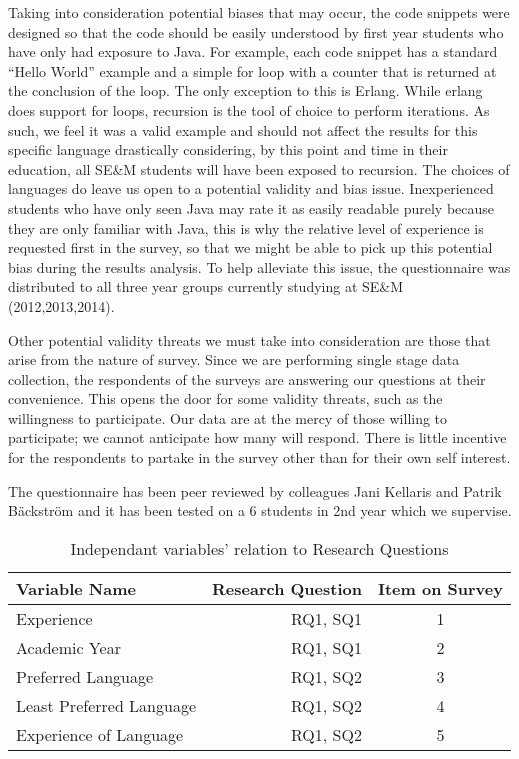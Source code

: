 \documentclass[times, 10pt,twocolumn]{IEEEtran}
\begin{document}
Taking into consideration potential biases that may occur, the code snippets were designed so that the code should be easily understood by first year students who have only had exposure to Java. For example, each code snippet has a standard ``Hello World'' example and a simple for loop with a counter that is returned at the conclusion of the loop. The only exception to this is Erlang. While erlang does support for loops, recursion is the tool of choice to perform iterations. As such, we feel it was a valid example and should not affect the results for this specific language drastically considering, by this point and time in their education, all SE\&M students will have been exposed to recursion. The choices of languages do leave us open to a potential validity and bias issue. Inexperienced students who have only seen Java may rate it as easily readable purely because they are only familiar with Java, this is why the relative level of experience is requested first in the survey, so that we might be able to pick up this potential bias during the results analysis. To help alleviate this issue, the questionnaire was distributed to all three year groups currently studying at SE\&M (2012,2013,2014).
\newline

Other potential validity threats we must take into consideration are those that arise from the nature of survey. Since we are performing single stage data collection, the respondents of the surveys are answering our questions at their convenience. This opens the door for some validity threats, such as the willingness to participate. Our data are at the mercy of those willing to participate; we cannot anticipate how many will respond. There is little incentive for the respondents to partake in the survey other than for their own self interest. 
\newline

The questionnaire has been peer reviewed by colleagues Jani Kellaris and Patrik Bäckström and it has been tested on a 6 students in 2nd year which we supervise. 

\begin{table}[ht]
  \centering
  \begin{tabular}{| l | r | c |}
    \hline
    \textbf{Variable Name} & \textbf{Research Question} & \textbf{Item on Survey} \\ \hline
    Experience & RQ1, SQ1 & 1 \\ \hline
    Academic Year & RQ1, SQ1 & 2 \\ \hline
    Preferred Language & RQ1, SQ2 & 3 \\ \hline
    Least Preferred Language & RQ1, SQ2& 4 \\  \hline
    Experience of Language & RQ1, SQ2 & 5 \\ 
    \hline
  \end{tabular}
  \caption{Independant variables' relation to Research Questions}
\end{table}
\end{document}
